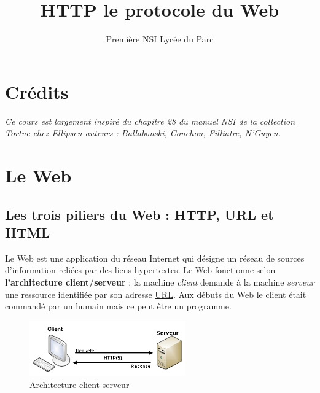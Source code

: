 \documentclass[
  11pt,
]{article}
\title{HTTP le protocole du Web}
\author{Première NSI Lycée du Parc}
\date{}
\newcounter{cours}
\newcounter{prog}
\begin{document}
\maketitle

\renewcommand*\contentsname{Table des matières}
{
\hypersetup{linkcolor=}
\setcounter{tocdepth}{3}
\tableofcontents
}
\hypertarget{cruxe9dits}{%
\section*{Crédits}\label{cruxe9dits}}

\emph{Ce cours est largement inspiré du chapitre 28 du manuel NSI de la
collection Tortue chez Ellipsen auteurs : Ballabonski, Conchon,
Filliatre, N'Guyen.}

\hypertarget{le-web}{%
\section{Le Web}\label{le-web}}

\hypertarget{les-trois-piliers-du-web-http-url-et-html}{%
\subsection{Les trois piliers du Web : HTTP, URL et
HTML}\label{les-trois-piliers-du-web-http-url-et-html}}

Le Web est une application du réseau Internet qui désigne un réseau de
sources d'information reliées par des liens hypertextes. Le Web
fonctionne selon \textbf{l'architecture client/serveur} : la machine
\emph{client} demande à la machine \emph{serveur} une ressource
identifiée par son adresse
\href{https://developer.mozilla.org/fr/docs/Glossaire/URL}{URL}. Aux
débuts du Web le client était commandé par un humain mais ce peut être
un programme.

\begin{center}{}

\begin{figure}
\centering
\includegraphics[width=0.6\textwidth,height=\textheight]{images/client-serveur.png}
\caption{Architecture client serveur}
\end{figure}

\end{center}
\end{document}

